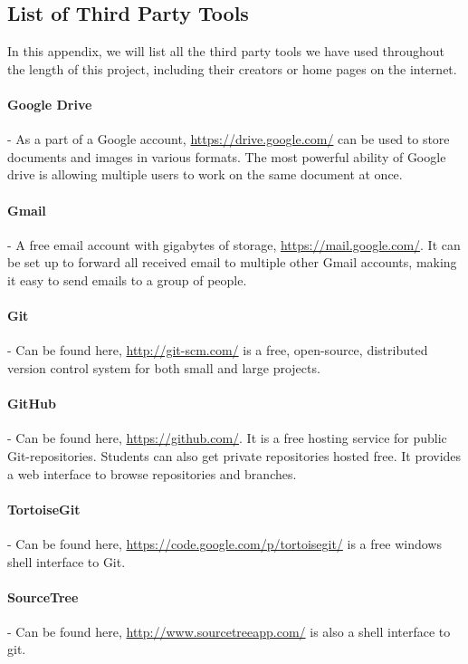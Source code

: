 \documentclass[../document]{subfiles}
\begin{document}
 

\subsection{List of Third Party Tools}
\label{third_party_tools}

In this appendix, we will list all the third party tools we have used throughout the length of this project, including their creators or home pages on the internet.

\paragraph{Google Drive} - As a part of a Google account, \url{https://drive.google.com/} can be used to store documents and images in various formats. The most powerful ability of Google drive is allowing multiple users to work on the same document at once.

\paragraph{Gmail} - A free email account with gigabytes of storage, \url{https://mail.google.com/}. It can be set up to forward all received email to multiple other Gmail accounts, making it easy to send emails to a group of people.

\paragraph{Git} - Can be found here, \url{http://git-scm.com/} is a free, open-source, distributed version control system for both small and large projects.

\paragraph{GitHub} - Can be found here, \url{https://github.com/}. It is a free hosting service for public Git-repositories. Students can also get private repositories hosted free. It provides a web interface to browse repositories and branches.

\paragraph{TortoiseGit} - Can be found here, \url{https://code.google.com/p/tortoisegit/} is a free windows shell interface to Git.

\paragraph{SourceTree} - Can be found here, \url{http://www.sourcetreeapp.com/} is also a shell interface to git.
\end{document}
